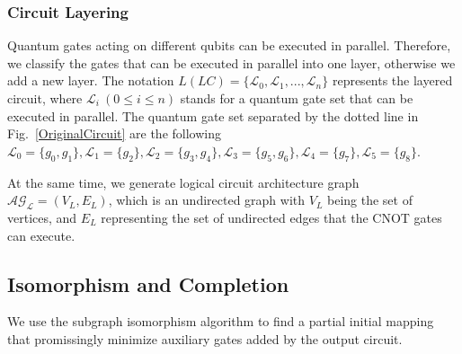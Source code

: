 \documentclass[runningheads]{llncs}
\begin{document}
\subsubsection{Circuit Layering}
Quantum gates acting on different qubits can be executed in parallel. Therefore, we classify the gates that can be executed in parallel into one layer, otherwise we add a new layer. The notation $L(LC)=\{\mathcal{L}_{0},\mathcal{L}_{1},...,\mathcal{L}_{n}\}$ represents the layered circuit, where $\mathcal{L}_{i} \ (0 \le i \le n) $ stands for a quantum gate set that can be executed in parallel. The quantum gate set separated by the dotted line in Fig.~\ref{OriginalCircuit} are the following $\mathcal{L}_{0}=\{g_{0},g_{1}\},\mathcal{L}_{1}=\{g_{2}\},
\mathcal{L}_{2}=\{g_{3},g_{4}\},\mathcal{L}_{3}=\{g_{5},g_{6}\},\mathcal{L}_{4}=\{g_{7}\},\mathcal{L}_{5}=\{g_{8}\}$.

At the same time, we generate logical circuit architecture graph $\mathcal{AG_{L}}=(V_{L},E_{L})$, which is an undirected graph with $V_{L}$ being the set of vertices, and $E_{L}$ representing the set of undirected edges that the CNOT gates can execute.

\subsection{Isomorphism and Completion}
We use the subgraph isomorphism algorithm to find a partial initial mapping that promissingly minimize auxiliary gates added by the output circuit.
\end{document}
